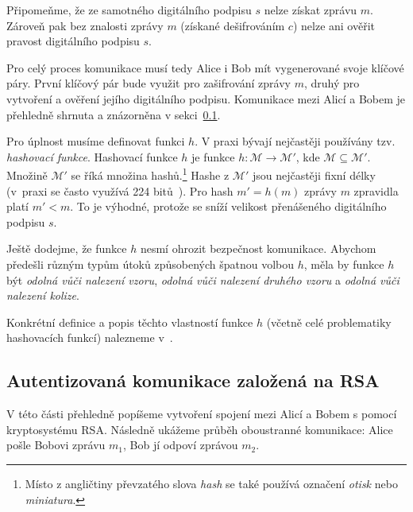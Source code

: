 \documentclass[
  program=infoi,
  biblatex=false,
  figures=true,
  glossaries,
  tables=false,
  sourcecodes=true,
  index
]{kidiplom}
\begin{document}
        Připomeňme, že ze samotného digitálního podpisu $s$ nelze získat zprávu $m$.
        Zároveň pak bez znalosti zprávy $m$ (získané dešifrováním $c$) nelze ani ověřit pravost digitálního podpisu $s$.

        \begin{remark}
            Pro celý proces komunikace musí tedy Alice i Bob mít vygenerované svoje klíčové páry.
            První klíčový pár bude využit pro zašifrování zprávy $m$, druhý pro vytvoření a ověření jejího digitálního podpisu.
            Komunikace mezi Alicí a Bobem je přehledně shrnuta a znázorněna v sekci~\ref{sub:RSA-communication}.
        \end{remark}

        Pro úplnost musíme definovat funkci $h$.
        V praxi bývají nejčastěji používány tzv. \emph{hashovací funkce}.
        Hashovací funkce $h$ je funkce $h: \mathcal{M} \rightarrow \mathcal{M'}$, kde $\mathcal{M} \subseteq \mathcal{M'}$.
        Množině $\mathcal{M'}$ se říká množina hashů.\footnote{Místo z angličtiny
        převzatého slova \emph{hash} se také používá označení \emph{otisk} nebo \emph{miniatura}.}
        Hashe z $\mathcal{M'}$ jsou nejčastěji fixní délky (v~praxi se často využívá 224 bitů~\cite{theory-and-practice}).
        Pro hash $m' = h(m)$ zprávy $m$ zpravidla platí $m' < m$.
        To je výhodné, protože se sníží velikost přenášeného digitálního podpisu $s$.

        Ještě dodejme, že funkce $h$ nesmí ohrozit bezpečnost komunikace.
        Abychom předešli různým typům útoků způsobených špatnou volbou $h$, měla by funkce $h$ být \emph{odolná vůči nalezení vzoru},
        \emph{odolná vůči nalezení druhého vzoru} a \emph{odolná vůči nalezení kolize}.

        Konkrétní definice a popis těchto vlastností funkce $h$ (včetně celé problematiky hashovacích funkcí)
        nalezneme v~\cite{theory-and-practice}.


\subsection{Autentizovaná komunikace založená na RSA}\label{sub:RSA-communication}
    
    V této části přehledně popíšeme vytvoření spojení mezi Alicí a Bobem s pomocí kryptosystému RSA.
    Následně ukážeme průběh oboustranné komunikace: Alice pošle Bobovi zprávu $m_1$, Bob jí odpoví zprávou $m_2$.

    \bigskip
\end{document}
